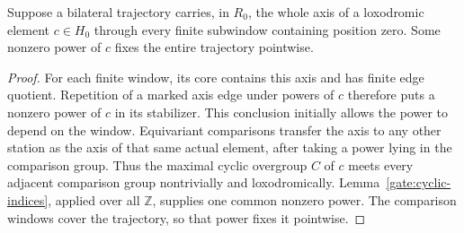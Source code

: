 \begin{corollary}\label{gate:rational-persistence}
Suppose a bilateral trajectory carries, in \(R_0\), the whole axis
of a loxodromic element \(c\in H_0\) through every finite subwindow
containing position zero. Some nonzero power of \(c\) fixes the
entire trajectory pointwise.
\end{corollary}
\begin{proof}
For each finite window, its core contains this axis and has finite
edge quotient. Repetition of a marked axis edge under powers of
\(c\) therefore puts a nonzero power of \(c\) in its stabilizer.
This conclusion initially allows the power to depend on the window.
Equivariant comparisons transfer the axis to any other station as
the axis of that same actual element, after taking a power lying
in the comparison group. Thus the maximal cyclic overgroup \(C\)
of \(c\) meets every adjacent comparison group nontrivially and
loxodromically. Lemma~\ref{gate:cyclic-indices}, applied over all
\(\mathbb Z\), supplies one common nonzero power. The comparison
windows cover the trajectory, so that power fixes it pointwise.
\end{proof}

